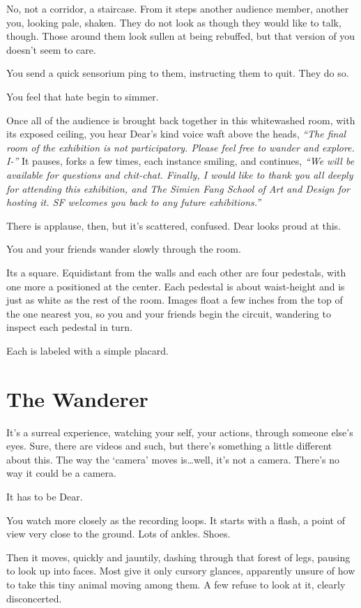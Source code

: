 No, not a corridor, a staircase. From it steps another audience member, another you, looking pale, shaken. They do not look as though they would like to talk, though. Those around them look sullen at being rebuffed, but that version of you doesn't seem to care.

You send a quick sensorium ping to them, instructing them to quit. They do so.

You feel that hate begin to simmer.

Once all of the audience is brought back together in this whitewashed room, with its exposed ceiling, you hear Dear's kind voice waft above the heads, \emph{``The final room of the exhibition is not participatory. Please feel free to wander and explore. I-''} It pauses, forks a few times, each instance smiling, and continues, \emph{``We will be available for questions and chit-chat. Finally, I would like to thank you all deeply for attending this exhibition, and The Simien Fang School of Art and Design for hosting it. SF welcomes you back to any future exhibitions.''}

There is applause, then, but it's scattered, confused. Dear looks proud at this.

You and your friends wander slowly through the room.

Its a square. Equidistant from the walls and each other are four pedestals, with one more a positioned at the center. Each pedestal is about waist-height and is just as white as the rest of the room. Images float a few inches from the top of the one nearest you, so you and your friends begin the circuit, wandering to inspect each pedestal in turn.

Each is labeled with a simple placard.

\newpage
\section*{The Wanderer}

It's a surreal experience, watching your self, your actions, through someone else's eyes. Sure, there are videos and such, but there's something a little different about this. The way the `camera' moves is\ldots{}well, it's not a camera. There's no way it could be a camera.

It has to be Dear.

You watch more closely as the recording loops. It starts with a flash, a point of view very close to the ground. Lots of ankles. Shoes.

Then it moves, quickly and jauntily, dashing through that forest of legs, pausing to look up into faces. Most give it only cursory glances, apparently unsure of how to take this tiny animal moving among them. A few refuse to look at it, clearly disconcerted.

